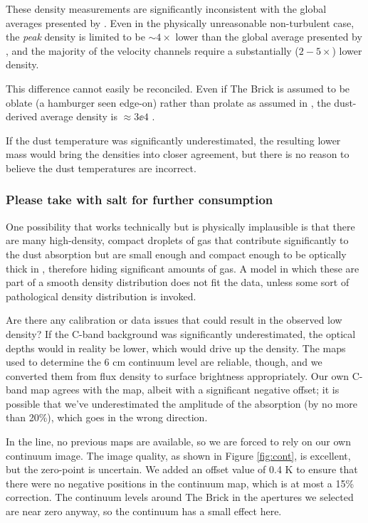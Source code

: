 These density measurements are significantly inconsistent with the global
averages presented by \citet{Longmore2012b}.  Even in the physically
unreasonable non-turbulent case, the \emph{peak} \formaldehyde density is
limited to be $\sim4\times$ lower than the global average presented by
\citet{Longmore2012b}, and the majority of the \formaldehyde velocity channels
require a substantially ($2-5\times$) lower density.

This difference cannot easily be reconciled.  Even if The Brick is assumed to
be oblate (a hamburger seen edge-on) rather than prolate as assumed in
\citet{Longmore2012b}, the dust-derived average density is $\approx3\ee{4}$
\percc.

If the dust temperature was significantly underestimated, the resulting lower mass 
would bring the densities into closer agreement, but there is no reason to believe
the dust temperatures are incorrect.

\subsubsection{Please take with salt for further consumption}
One possibility that works technically but is physically implausible is that
there are many high-density, compact droplets of gas that contribute
significantly to the dust absorption but are small enough and compact enough to
be optically thick in \formaldehyde \oneone, therefore hiding significant
amounts of gas.  A model in which these are part of a smooth density
distribution does not fit the data, unless some sort of pathological density
distribution is invoked.

Are there any calibration or data issues that could result in the observed low
density?  If the C-band background was significantly underestimated, the \oneone
optical depths would in reality be lower, which would drive up the density.
The \citet{Law2008a} maps used to determine the 6 cm \oneone continuum level
are reliable, though, and we converted them from flux density to surface brightness
appropriately.  Our own C-band map agrees with the \citet{Law2008a} map, albeit
with a significant negative offset; it is possible that we've underestimated
the amplitude of the \formaldehyde absorption (by no more than 20\%), which
goes in the wrong direction.

In the \twotwo line, no previous maps are available, so we are forced to rely
on our own continuum image.  The image quality, as shown in Figure
\ref{fig:cont}, is excellent, but the zero-point is uncertain.  We added an
offset value of 0.4 K to ensure that there were no negative positions in the
continuum map, which is at most a 15\% correction.  The continuum levels around
The Brick in the apertures we selected are near zero anyway, so the continuum
has a small effect here.

